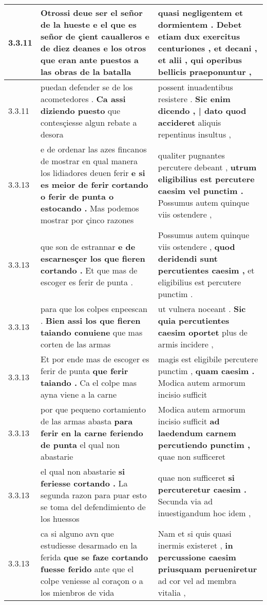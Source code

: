 \begin{tabular}{|p{1cm}|p{6.5cm}|p{6.5cm}|}
3.3.11 & Otrossi deue ser el señor de la hueste \textbf{ e el que es señor de çient caualleros e de diez deanes } e los otros que eran ante puestos a las obras de la batalla & quasi negligentem et dormientem . \textbf{ Debet etiam dux exercitus centuriones , et decani , et alii , } qui operibus bellicis praeponuntur , \\\hline
3.3.11 & puedan defender se de los acometedores . \textbf{ Ca assi diziendo puesto } que contesçiesse algun rebate a desora & possent inuadentibus resistere . \textbf{ Sic enim dicendo , | dato quod accideret } aliquis repentinus insultus , \\\hline
3.3.13 & e de ordenar las azes fincanos de mostrar en qual manera los lidiadores deuen ferir \textbf{ e si es meior de ferir cortando o ferir de punta o estocando . } Mas podemos mostrar por çinco razones & qualiter pugnantes percutere debeant , \textbf{ utrum eligibilius est percutere caesim vel punctim . } Possumus autem quinque viis ostendere , \\\hline
3.3.13 & que son de estrannar \textbf{ e de escarnesçer los que fieren cortando . } Et que mas de escoger es ferir de punta . & Possumus autem quinque viis ostendere , \textbf{ quod deridendi sunt percutientes caesim , } et eligibilius est percutere punctim . \\\hline
3.3.13 & para que los colpes enpeescan . \textbf{ Bien assi los que fieren taiando conuiene } que mas corten de las armas & ut vulnera noceant . \textbf{ Sic quia percutientes caesim oportet } plus de armis incidere , \\\hline
3.3.13 & Et por ende mas de escoger es ferir de punta \textbf{ que ferir taiando . } Ca el colpe mas ayna viene a la carne & magis est eligibile percutere punctim , \textbf{ quam caesim . } Modica autem armorum incisio sufficit \\\hline
3.3.13 & por que pequeno cortamiento de las armas abasta \textbf{ para ferir en la carne feriendo de punta } el qual non abastarie & Modica autem armorum incisio sufficit \textbf{ ad laedendum carnem percutiendo punctim , } quae non sufficeret \\\hline
3.3.13 & el qual non abastarie \textbf{ si feriesse cortando . } La segunda razon para puar esto se toma del defendimiento de los huessos & quae non sufficeret \textbf{ si percuteretur caesim . } Secunda via ad inuestigandum hoc idem , \\\hline
3.3.13 & ca si alguno avn que estudiesse desarmado en la ferida \textbf{ que se faze cortando fuesse ferido } ante que el colpe veniesse al coraçon o a los mienbros de vida & Nam et si quis quasi inermis existeret , \textbf{ in percussione caesim priusquam perueniretur } ad cor vel ad membra vitalia , \\\hline

\end{tabular}
